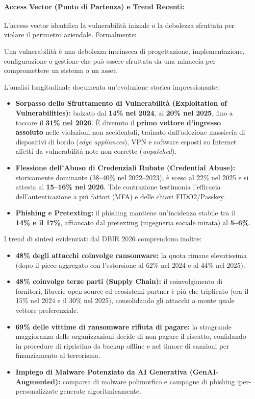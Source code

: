 \documentclass[../../main.tex]{subfiles}
\begin{document}
\paragraph{Access Vector (Punto di Partenza) e Trend Recenti:}
L'access vector identifica la vulnerabilità iniziale o la debolezza sfruttata per violare il perimetro aziendale. Formalmente:
\begin{definition}[Vulnerabilità]
Una vulnerabilità è una debolezza intrinseca di progettazione, implementazione, configurazione o gestione che può essere sfruttata da una minaccia per compromettere un sistema o un asset.
\end{definition}

L'analisi longitudinale documenta un'evoluzione storica impressionante:
\begin{itemize}
    \item \textbf{Sorpasso dello Sfruttamento di Vulnerabilità (Exploitation of Vulnerabilities):} balzato dal \textbf{14\% nel 2024}, al \textbf{20\% nel 2025}, fino a toccare il \textbf{31\% nel 2026}. È divenuto il \textbf{primo vettore d'ingresso assoluto} nelle violazioni non accidentali, trainato dall'adozione massiccia di dispositivi di bordo (\textit{edge appliances}), VPN e software esposti su Internet affetti da vulnerabilità note non corrette (\textit{unpatched}).
    \item \textbf{Flessione dell'Abuso di Credenziali Rubate (Credential Abuse):} storicamente dominante (38--40\% nel 2022--2023), è sceso al 22\% nel 2025 e si attesta al \textbf{15--16\% nel 2026}. Tale contrazione testimonia l'efficacia dell'autenticazione a più fattori (MFA) e delle chiavi FIDO2/Passkey.
    \item \textbf{Phishing e Pretexting:} il phishing mantiene un'incidenza stabile tra il \textbf{14\% e il 17\%}, affiancato dal pretexting (ingegneria sociale mirata) al \textbf{5--6\%}.
\end{itemize}

I trend di sintesi evidenziati dal DBIR 2026 comprendono inoltre:
\begin{itemize}
    \item \textbf{48\% degli attacchi coinvolge ransomware:} la quota rimane elevatissima (dopo il picco aggregato con l'estorsione al 62\% nel 2024 e al 44\% nel 2025).
    \item \textbf{48\% coinvolge terze parti (Supply Chain):} il coinvolgimento di fornitori, librerie open-source ed ecosistemi partner è più che triplicato (era il 15\% nel 2024 e il 30\% nel 2025), consolidando gli attacchi a monte quale vettore preferenziale.
    \item \textbf{69\% delle vittime di ransomware rifiuta di pagare:} la stragrande maggioranza delle organizzazioni decide di non pagare il riscatto, confidando in procedure di ripristino da backup offline e nel timore di sanzioni per finanziamento al terrorismo.
    \item \textbf{Impiego di Malware Potenziato da AI Generativa (GenAI-Augmented):} comparsa di malware polimorfico e campagne di phishing iper-personalizzate generate algoritmicamente.
\end{itemize}
\end{document}
